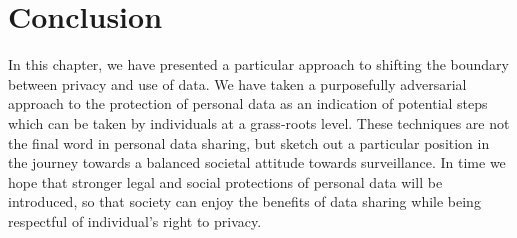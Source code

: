 \documentclass{IOS-Book-Article}     %
\begin{document}
\section{Conclusion}

In this chapter, we have presented a particular approach to shifting the
boundary between privacy and use of data. We have taken a purposefully
adversarial approach to the protection of personal data as an indication of
potential steps which can be taken by individuals at a grass-roots level. 
These techniques are not the final word in personal data sharing, but sketch out
a particular position in the journey towards a balanced societal attitude
towards surveillance.
In
time we hope that stronger legal and social protections of personal data will be
introduced, so that society can enjoy the benefits of data sharing while being
respectful of individual's right to
privacy\cite{rooney2012OpenData,rauhofer2012FutureProofing}. 






\end{document}
